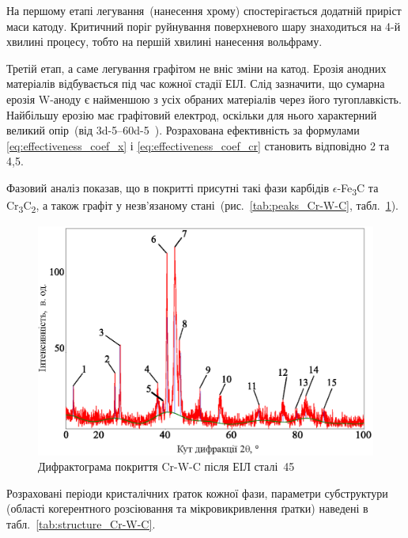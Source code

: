 \documentclass[a4paper,fontsize=14bp,ukrainian]{extreport}
\begin{document}
На першому етапі легування~(нанесення хрому) спостерігається додатній приріст маси катоду. Критичний поріг руйнування поверхневого шару знаходиться на 4-й хвилині процесу, тобто  на першій хвилині нанесення вольфраму.

Третій етап, а саме легування графітом не вніс зміни на катод. Ерозія анодних матеріалів відбувається під час кожної стадії ЕІЛ. Слід зазначити, що сумарна ерозія W-аноду є найменшою з усіх обраних матеріалів через його тугоплавкість. Найбільшу ерозію має графітовий електрод, оскільки для нього характерний великий опір~(від \SIrange{3d-5}{60d-5}{\mkomm}~\cite{web:resistivity}). Розрахована ефективність за формулами \eqref{eq:effectiveness_coef_x} і \eqref{eq:effectiveness_coef_cr} становить відповідно 2 та 4,5.



Фазовий аналіз показав, що в покритті присутні такі фази карбідів $\epsilon$-Fe\textsubscript{3}C та Cr\textsubscript{3}C\textsubscript{2}, а також графіт у незв'язаному стані~(рис.~\ref{tab:peaks_Cr-W-C}, табл.~\ref{fig:peaks_Cr-W-C}).
\begin{figure}[H]
\centering
\includegraphics[width=\textwidth]{rigaku_peaks_Cr-W-C.ps}
\caption{Дифрактограма покриття Cr-W-C після ЕІЛ сталі~45}
\label{fig:peaks_Cr-W-C}
\end{figure}

Розраховані періоди кристалічних ґраток кожної фази, параметри субструктури (області когерентного розсіювання та мікровикривлення ґратки) наведені в табл.~\ref{tab:structure_Cr-W-C}.
\end{document}

